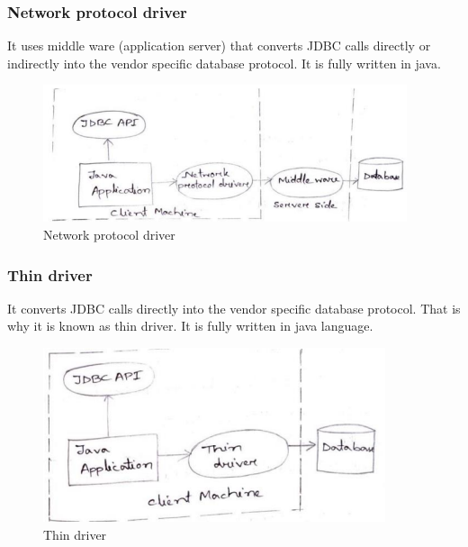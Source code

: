 \documentclass[twocolumn, a4paper]{article}
\begin{document}
\subsubsection{Network protocol driver}
It uses middle ware (application server) that converts JDBC calls directly or
indirectly into the vendor specific database protocol. It is fully written in
java.
\begin{figure}[ht]
  \centering
  \includegraphics[width=\columnwidth]{jdbcnet}
  \caption{Network protocol driver}
\end{figure}

\subsubsection{Thin driver}
It converts JDBC calls directly into the vendor specific database protocol.
That is why it is known as thin driver. It is fully written in java language.

\begin{figure}[ht]
  \centering
  \includegraphics[width=\columnwidth]{jdbcthin}
  \caption{Thin driver}
\end{figure}
\end{document}
